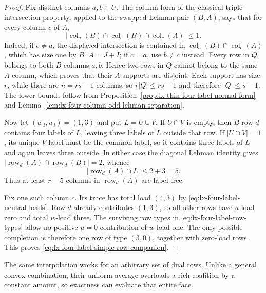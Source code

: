 \begin{proof}
Fix distinct columns $a,b\in U$.  The column form of the classical
triple-intersection property, applied to the swapped Lehman pair $(B,A)$,
says
that for every column $c$ of $A$,
\[
 \bigl|\operatorname{col}_a(B)\cap
        \operatorname{col}_b(B)\cap
        \operatorname{col}_c(A)\bigr|\leq1.         \tag{LH-4i}
\label{eq:lx-four-label-triple-intersection}
\]
Indeed, if $c\ne a$, the displayed intersection is contained in
$\operatorname{col}_a(B)\cap\operatorname{col}_c(A)$, which has size one by
$B^\top A=J+I$; if $c=a$, use $b\ne c$ instead.
Every row in $Q$ belongs to both $B$-columns $a,b$.  Hence two rows in $Q$
cannot belong to the same $A$-column, which proves that their $A$-supports
are disjoint.  Each support has size $r$, while there are $n=rs-1$ columns,
so $r|Q|\leq rs-1$ and therefore $|Q|\leq s-1$.  The lower bounds follow
from Proposition~\ref{prop:lx-thin-four-label-normal-form} and
Lemma~\ref{lem:lx-four-column-odd-lehman-separation}.

Now let $(w_d,u_d)=(1,3)$ and put $L=U\cup V$.  If $U\cap V$ is empty, then
$B$-row $d$ contains four labels of $L$, leaving three labels of $L$ outside
that row.  If $|U\cap V|=1$, its unique $V$-label must be the common label,
so it contains three labels of $L$ and again leaves three outside.  In either
case the diagonal Lehman identity gives
$|\operatorname{row}_d(A)\cap\operatorname{row}_d(B)|=2$, whence
\[
 |\operatorname{row}_d(A)\cap L|\leq2+3=5.
\]
Thus at least $r-5$ columns in $\operatorname{row}_d(A)$ are label-free.

Fix one such column $c$.  Its trace has total load $(4,3)$ by
\eqref{eq:lx-four-label-neutral-loads}.  Row $d$ already contributes
$(1,3)$, so all other rows have $u$-load zero and total $w$-load three.
The surviving row types in \eqref{eq:lx-four-label-row-types} allow no
positive $u=0$ contribution of $w$-load one.  The only possible completion is
therefore one row of type $(3,0)$, together with zero-load rows.  This proves
\eqref{eq:lx-four-label-simple-row-companion}.
\end{proof}

The same interpolation works for an arbitrary set of dual rows.  Unlike a
general convex combination, their uniform average overloads a rich coalition
by a constant amount, so exactness can evaluate that entire face.

